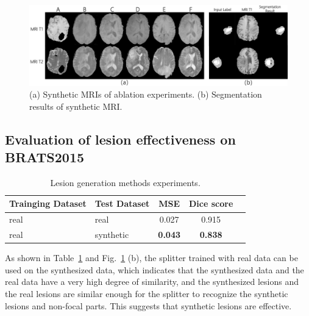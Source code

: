 \documentclass[runningheads]{llncs}
\begin{document}
	\begin{figure}
		\centering
		\includegraphics[width=0.9\linewidth]{figures/ablation}
		\caption{(a) Synthetic MRIs of ablation experiments. (b) Segmentation results of synthetic MRI. }
		\label{ablation_and_seg}
	\end{figure}
	\subsection{Evaluation of lesion effectiveness on BRATS2015}
	\label{label gen methods tests}
	\begin{table}
		\begin{center}
			\caption{Lesion generation methods experiments.}
			\label{label_test}
			\begin{tabular}{llccc}
				\hline
				
				Trainging Dataset &Test Dataset &MSE   &Dice score \\
				\hline
				real &real 	    &0.027          &0.915 \\							
				real &synthetic	&\textbf{0.043} &\textbf{0.838} \\
				\hline
			\end{tabular}
		\end{center}
	\end{table}
	As shown in Table~\ref{label_test} and Fig.~\ref{ablation_and_seg} (b), the splitter trained with real data can be used on the synthesized data, which indicates that the synthesized data and the real data have a very high degree of similarity, and the synthesized lesions and the real lesions are similar enough for the splitter to recognize the synthetic lesions and non-focal parts. This suggests that synthetic lesions are effective.
\end{document}

